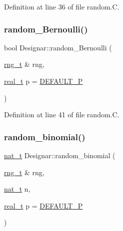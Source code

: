 Definition at line 36 of file random.\+C.

\mbox{\label{namespace_designar_adf6febbe5fa0abe44ea554203b767685}} 
\subsubsection{\texorpdfstring{random\+\_\+\+Bernoulli()}{random\_Bernoulli()}}
{\footnotesize\ttfamily bool Designar\+::random\+\_\+\+Bernoulli (\begin{DoxyParamCaption}\item[{\hyperlink{namespace_designar_a9ca84e2ff5daa62ebc4dab52f3a6c855}{rng\+\_\+t} \&}]{rng,  }\item[{\hyperlink{namespace_designar_aca2c32af26808dbec1f3a3071fad25ce}{real\+\_\+t}}]{p = {\ttfamily \hyperlink{namespace_designar_a2b9b8e0588e8d75548e74bd590e6f9e5}{D\+E\+F\+A\+U\+L\+T\+\_\+P}} }\end{DoxyParamCaption})}



Definition at line 41 of file random.\+C.

\mbox{\label{namespace_designar_a4f786bd2e0e15f81f468cf60b3a1d9fb}} 
\subsubsection{\texorpdfstring{random\+\_\+binomial()}{random\_binomial()}}
{\footnotesize\ttfamily \hyperlink{namespace_designar_aa72662848b9f4815e7bf31a7cf3e33d1}{nat\+\_\+t} Designar\+::random\+\_\+binomial (\begin{DoxyParamCaption}\item[{\hyperlink{namespace_designar_a9ca84e2ff5daa62ebc4dab52f3a6c855}{rng\+\_\+t} \&}]{rng,  }\item[{\hyperlink{namespace_designar_aa72662848b9f4815e7bf31a7cf3e33d1}{nat\+\_\+t}}]{n,  }\item[{\hyperlink{namespace_designar_aca2c32af26808dbec1f3a3071fad25ce}{real\+\_\+t}}]{p = {\ttfamily \hyperlink{namespace_designar_a2b9b8e0588e8d75548e74bd590e6f9e5}{D\+E\+F\+A\+U\+L\+T\+\_\+P}} }\end{DoxyParamCaption})}



